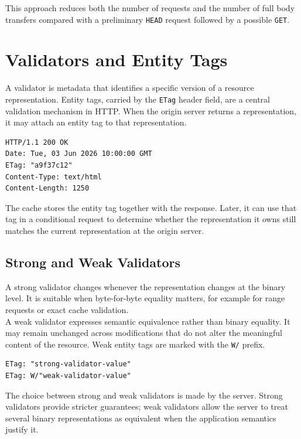 \documentclass{scrbook}
\begin{document}
This approach reduces both the number of requests and the number of full body transfers compared with a preliminary \texttt{HEAD} request followed by a possible \texttt{GET}.

\section{Validators and Entity Tags}

A validator is metadata that identifies a specific version of a resource representation. Entity tags, carried by the \texttt{ETag} header field, are a central validation mechanism in HTTP. When the origin server returns a representation, it may attach an entity tag to that representation.

\begin{lstlisting}
HTTP/1.1 200 OK
Date: Tue, 03 Jun 2026 10:00:00 GMT
ETag: "a9f37c12"
Content-Type: text/html
Content-Length: 1250
\end{lstlisting}

The cache stores the entity tag together with the response. Later, it can use that tag in a conditional request to determine whether the representation it owns still matches the current representation at the origin server.

\subsection{Strong and Weak Validators}

A strong validator changes whenever the representation changes at the binary level. It is suitable when byte-for-byte equality matters, for example for range requests or exact cache validation.\\

A weak validator expresses semantic equivalence rather than binary equality. It may remain unchanged across modifications that do not alter the meaningful content of the resource. Weak entity tags are marked with the \texttt{W/} prefix.

\begin{lstlisting}
ETag: "strong-validator-value"
ETag: W/"weak-validator-value"
\end{lstlisting}

The choice between strong and weak validators is made by the server. Strong validators provide stricter guarantees; weak validators allow the server to treat several binary representations as equivalent when the application semantics justify it.
\end{document}
